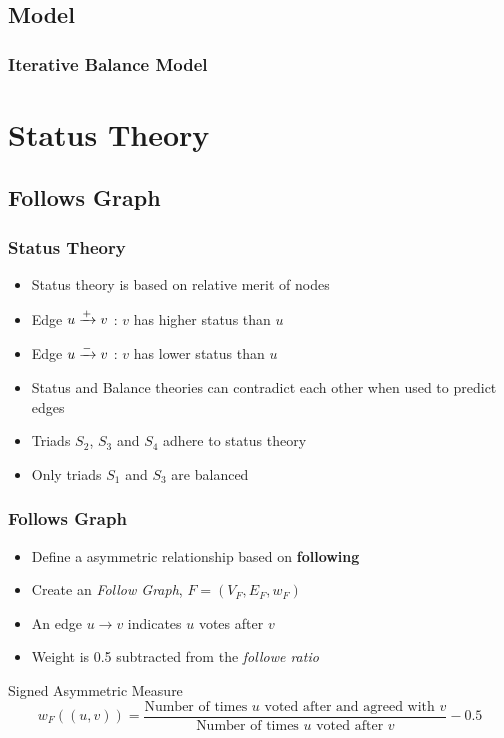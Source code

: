 \documentclass{beamer}
\begin{document}
\subsection{Model}
\begin{frame}
    \frametitle{Iterative Balance Model}
    \centering
    \scalebox{0.7}{}

\end{frame}

\section{Status Theory}


\subsection{Follows Graph}

\begin{frame}
    \frametitle{Status Theory}
    \begin{itemize}
        \item Status theory is based on relative merit of nodes
        \item Edge $u\xrightarrow{+} v$ : $v$ has higher status than $u$
        \item Edge $u \xrightarrow{-} v$ : $v$ has lower status than $u$
        \item Status and Balance theories can contradict each other when used to predict edges
        \item Triads $S_2$, $S_3$ and $S_4$ adhere to status theory
        \item Only triads $S_1$ and $S_3$ are balanced 
    \end{itemize}
    \begin{figure}
        \centering
        \scalebox{0.7}{}
    \end{figure}

\end{frame}

\begin{frame}
    \frametitle{Follows Graph}
    \begin{itemize}
        \item Define a asymmetric relationship based on \textbf{following} 
        \item Create an \textit{Follow Graph}, $F=(V_F,E_F,w_F)$
        \item An edge $u \rightarrow v$ indicates $u$ votes after $v$
        \item Weight is 0.5 subtracted from the \textit{followe ratio}
    \end{itemize}
    \begin{block}{Signed Asymmetric Measure}
        $$ w_{F}((u,v)) = \frac{\text{Number of times } u \text{ voted after and agreed with } v }{\text{Number of times } u \text{ voted after } v} -0.5$$
    \end{block}

\end{frame}
\end{document}

